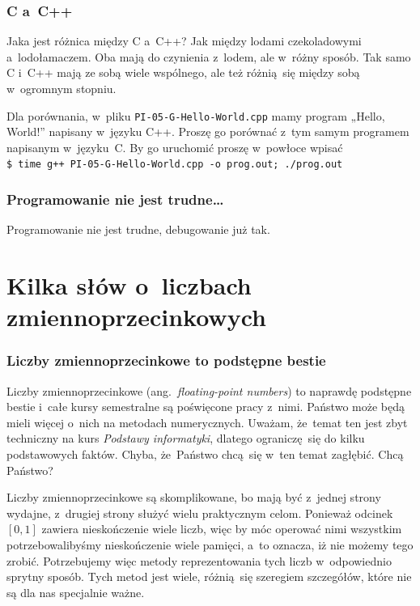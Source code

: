 \documentclass[10pt,t]{beamer}
\begin{document}
\begin{frame}
  \frametitle{C a~C++}


  Jaka jest różnica między C a~C++? Jak między lodami czekoladowymi
  a~lodołamaczem. Oba mają do czynienia z~lodem, ale w~różny sposób.
  Tak samo C i~C++ mają ze sobą wiele wspólnego, ale też różnią~się między
  sobą w~ogromnym stopniu.

  Dla porównania, w~pliku \texttt{PI-05-G-Hello-World.cpp} mamy program
  „Hello, World!” napisany w~języku C++. Proszę go porównać z~tym samym
  programem napisanym w~języku~C. By go uruchomić proszę w~powłoce wpisać \\
  \texttt{\$ time g++ PI-05-G-Hello-World.cpp -o prog.out; ./prog.out}

\end{frame}





\begin{frame}
  \frametitle{Programowanie nie jest trudne\ldots}


  Programowanie nie jest trudne, debugowanie już tak.

\end{frame}










\section{Kilka słów o~liczbach zmiennoprzecinkowych}


\begin{frame}
  \frametitle{Liczby zmiennoprzecinkowe to podstępne bestie}


  Liczby zmiennoprzecinkowe (ang.~\textit{floating-point numbers}) to
  naprawdę podstępne bestie i~całe kursy semestralne są poświęcone
  pracy z~nimi. Państwo może będą mieli więcej o~nich na metodach
  numerycznych. Uważam, że~temat ten jest zbyt techniczny na kurs
  \textit{Podstawy informatyki}, dlatego ograniczę~się do kilku podstawowych
  faktów. Chyba, że~Państwo chcą~się w~ten temat zagłębić. Chcą Państwo?

  Liczby zmiennoprzecinkowe są skomplikowane, bo mają być z~jednej strony
  wydajne, z~drugiej strony służyć wielu praktycznym celom. Ponieważ
  odcinek $[ 0, 1 ]$ zawiera nieskończenie wiele liczb, więc by móc operować
  nimi wszystkim potrzebowalibyśmy nieskończenie wiele pamięci, a~to oznacza,
  iż nie możemy tego zrobić. Potrzebujemy więc metody reprezentowania tych
  liczb w~odpowiednio sprytny sposób. Tych metod jest wiele, różnią~się
  szeregiem szczegółów, które nie są dla nas specjalnie ważne.

\end{frame}
\end{document}
